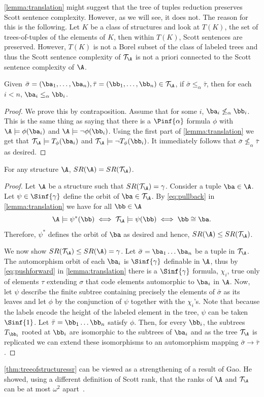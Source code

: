 \documentclass{amsart}
\newcommand{\T}{{\mathcal{T}}}
\newcommand{\SR}{SR}
\begin{document}
\cref{lemma:translation} might suggest that the tree of tuples reduction
preserves Scott sentence complexity. However, as we will see, it does not.
The reason for this is the following. Let $K$ be a class of structures and look at $T(K)$, the set of trees-of-tuples
of the elements of $K$, then within $T(K)$, Scott sentences are preserved. However,
$T(K)$ is not a Borel subset of the class of labeled trees and thus the
Scott sentence complexity of $\T_\A$ is not a priori connected to the Scott
sentence complexity of $\A$.
\begin{proposition}\label{prop:treeofstructuresbf}
Given
$\bar\sigma=(\ba_1,\dots,\ba_n),\bar\tau=(\bb_1,\dots,\bb_n)\in \T_\A$, if
$\bar\sigma\leq_\alpha \bar\tau$, then for
each $i<n$, $\ba_i\leq_\alpha \bb_i$.
\end{proposition}
\begin{proof}
We prove this by contraposition.
Assume that for some $i$, $\ba_i\not\leq_\alpha \bb_i$. 
This is the same thing as saying that there is a $\Pinf{\alpha}$ formula $\phi$
with $\A\models\phi(\ba_i)$ and $\A\models\lnot\phi(\bb_i)$.
Using the first part of \cref{lemma:translation} we get that $\T_\A\models
T_\phi(\ba_i)$ and $\T_\A\models\lnot T_\phi(\bb_i)$.
It immediately follows that $\bar\sigma\not\leq_\alpha \bar\tau$ as desired.
\end{proof}
\begin{theorem}\label{thm:treeofstructuressr}
For any structure $\A$, $\SR(\A)=\SR(\T_\A)$. 
\end{theorem}
\begin{proof}
Let $\A$ be a structure such that $SR(\T_\A)=\gamma$. Consider a tuple $\ba\in \A$. Let
$\psi\in\Sinf{\gamma}$ define the orbit of $\ba\in \T_\A$. By \cref{eq:pullback}
in \cref{lemma:translation} we have for all $\bb\in \A$ \[\A\models
\psi^*(\bb)\iff \T_\A\models \psi(\bb) \iff \bb\cong \ba.\] Therefore, $\psi^*$
defines the orbit of $\ba$ as desired and hence, $\SR(\A)\leq\SR(\T_\A)$. 

We now show $\SR(\T_\A)\leq\SR(\A)=\gamma$. Let $\bar\sigma=\ba_1\dots\ba_n$ be
a tuple in $\T_\A$. The automorphism orbit of each  $\ba_i$ is $\Sinf{\gamma}$
definable in $\A$, thus by \cref{eq:pushforward} in \cref{lemma:translation}
there is a $\Sinf{\gamma}$ formula, $\chi_i$,  true only of elements $\tau$ extending $\sigma$ 
that code elements automorphic to $\ba_i$ in $\A$. Now, let
$\psi$ describe the finite subtree containing precisely the elements of
$\bar\sigma$ as its leaves and let $\phi$ by the conjunction of $\psi$ together
with the $\chi_i$'s. Note that
because the labels encode the height of the labeled element in the tree, $\psi$
can be taken $\Sinf{1}$. Let $\bar \tau=\bb_1\dots\bb_n$ satisfy $\phi$. Then,
for every $\bb_i$, the subtrees $T_{\bb_i}$ rooted at $\bb_i$ are isomorphic to
the subtrees of $\ba_i$ and as the tree $\T_\A$ is replicated we can extend
these isomorphisms to an automorphism mapping $\bar\sigma\to \bar\tau$.
\end{proof}
\cref{thm:treeofstructuressr} can be viewed as a strengthening of a result of
Gao. He showed, using a different definition of Scott rank, that the ranks of
$\A$ and $\T_\A$ can be at most $\omega^2$ apart~\cite{gao2001}. 
\end{document}
